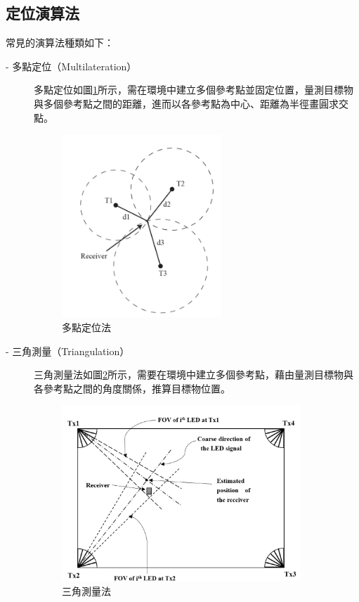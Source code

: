     \subsection{定位演算法}
    \label{chp:method-algorithm}
    常見的演算法種類如下：
    \begin{description}
        \item[- 多點定位（Multilateration）]\hfill 
        
        \qquad
        多點定位如圖\ref{pic:multilateration}所示，需在環境中建立多個參考點並固定位置，量測目標物與多個參考點之間的距離，進而以各參考點為中心、距離為半徑畫圓求交點。

        \begin{figure}[h]
            \centering
            \includegraphics[width=6cm]{ch2pic/multilateration.png}
            \caption{多點定位法\cite{survey_light2020}}
            \label{pic:multilateration}
        \end{figure}
    
        \item[- 三角測量（Triangulation）] \hfill 
        
        \qquad
        三角測量法如圖\ref{pic:triangulation}所示，需要在環境中建立多個參考點，藉由量測目標物與各參考點之間的角度關係，推算目標物位置。
        \begin{figure}[h]
            \centering
            \includegraphics[width=9cm]{ch2pic/triangulation.png}
            \caption{三角測量法\cite{survey_light2018}}
            \label{pic:triangulation}
        \end{figure}
        

\end{description}
